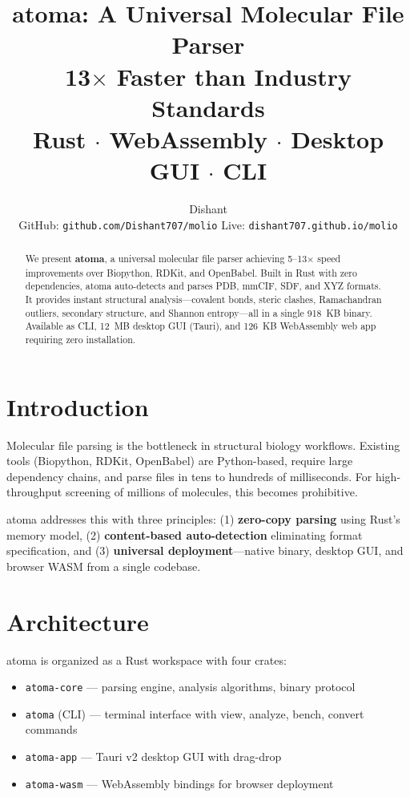 \documentclass[10pt,conference]{IEEEtran}
\title{\Huge\textbf{atoma}: A Universal Molecular File Parser\\[4pt] \large 13$\times$ Faster than Industry Standards\\[4pt] \normalsize Rust $\cdot$ WebAssembly $\cdot$ Desktop GUI $\cdot$ CLI}
\author{Dishant\\[2pt] \footnotesize GitHub: \texttt{github.com/Dishant707/molio} \hspace{6pt} Live: \texttt{dishant707.github.io/molio}}
\begin{document}
\maketitle

\begin{abstract}
We present \textbf{atoma}, a universal molecular file parser achieving 5--13$\times$ speed improvements over Biopython, RDKit, and OpenBabel. Built in Rust with zero dependencies, atoma auto-detects and parses PDB, mmCIF, SDF, and XYZ formats. It provides instant structural analysis---covalent bonds, steric clashes, Ramachandran outliers, secondary structure, and Shannon entropy---all in a single 918~KB binary. Available as CLI, 12~MB desktop GUI (Tauri), and 126~KB WebAssembly web app requiring zero installation.
\end{abstract}

\section{Introduction}
Molecular file parsing is the bottleneck in structural biology workflows. Existing tools (Biopython, RDKit, OpenBabel) are Python-based, require large dependency chains, and parse files in tens to hundreds of milliseconds. For high-throughput screening of millions of molecules, this becomes prohibitive.

atoma addresses this with three principles: (1) \textbf{zero-copy parsing} using Rust's memory model, (2) \textbf{content-based auto-detection} eliminating format specification, and (3) \textbf{universal deployment}---native binary, desktop GUI, and browser WASM from a single codebase.

\section{Architecture}
atoma is organized as a Rust workspace with four crates:

\begin{itemize}
  \item \texttt{atoma-core} --- parsing engine, analysis algorithms, binary protocol
  \item \texttt{atoma} (CLI) --- terminal interface with view, analyze, bench, convert commands
  \item \texttt{atoma-app} --- Tauri v2 desktop GUI with drag-drop
  \item \texttt{atoma-wasm} --- WebAssembly bindings for browser deployment
\end{itemize}
\end{document}

